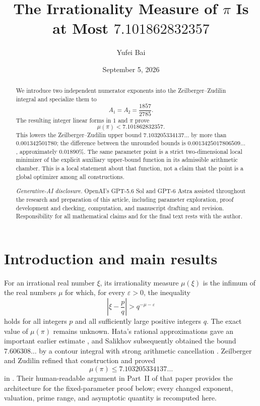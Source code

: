 \documentclass[11pt,reqno,letterpaper]{amsart}
\title{The Irrationality Measure of $\pi$ Is at Most
  $7.101862832357$}
\author{Yufei Bai}
\date{September 5, 2026}
\numberwithin{equation}{section}
\theoremstyle{definition}
\theoremstyle{remark}
\begin{document}
\begin{abstract}
We introduce two independent numerator exponents into the
Zeilberger--Zudilin integral and specialize them to
\[
  A_1=A_2=\frac{1857}{2785}.
\]
The resulting integer linear forms in $1$ and $\pi$ prove
\[
  \mu(\pi)<7.101862832357.
\]
This lowers the Zeilberger--Zudilin upper bound
$7.103205334137\ldots$ by more than $0.001342501780$; the difference
between the unrounded bounds is $0.0013425017806509\ldots$,
approximately $0.01890\%$.  The same parameter point is a strict
two-dimensional local minimizer of the explicit auxiliary upper-bound
function in its admissible arithmetic chamber.  This is a local statement
about that function, not a claim that the point is a global optimizer among
all constructions.

\par\smallskip
\noindent\textit{Generative-AI disclosure.}
OpenAI's GPT-5.6 Sol and GPT-6 Astra assisted throughout the research and
preparation of this article, including parameter exploration, proof
development and checking, computation, and manuscript drafting and revision.
Responsibility for all mathematical claims and for the final text rests with
the author.
\end{abstract}

\maketitle

\section{Introduction and main results}\label{sec:introduction}

For an irrational real number $\xi$, its irrationality measure $\mu(\xi)$
is the infimum of the real numbers $\mu$ for which, for every
$\varepsilon>0$, the inequality
\[
  \left|\xi-\frac pq\right|>q^{-\mu-\varepsilon}
\]
holds for all integers $p$ and all sufficiently large positive integers
$q$.  The exact value of $\mu(\pi)$ remains unknown.  Hata's rational
approximations gave an important earlier estimate \cite{hata-1993}, and
Salikhov subsequently obtained the bound $7.606308\ldots$ by a contour
integral with strong arithmetic cancellation \cite{salikhov-2010}.
Zeilberger and Zudilin refined that construction and proved
\[
  \mu(\pi)\leq 7.103205334137\ldots
\]
in \cite{zeilberger-zudilin-2020}.  Their human-readable argument in
Part~II of that paper provides the architecture for the fixed-parameter
proof below; every changed exponent, valuation, prime range, and
asymptotic quantity is recomputed here.
\end{document}

